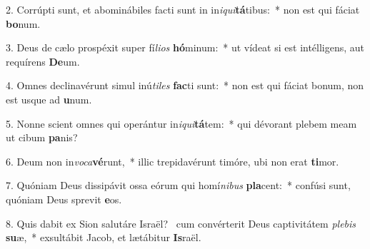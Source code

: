 2. Corrúpti sunt, et abominábiles facti sunt in in\textit{i}\textit{qui}\textbf{tá}tibus:~*  non est qui fáciat \textbf{bo}num.\

3. Deus de cælo prospéxit super fí\textit{li}\textit{os} \textbf{hó}minum:~*  ut vídeat si est intélligens, aut requírens \textbf{De}um.\

4. Omnes declinavérunt simul inú\textit{ti}\textit{les} \textbf{fac}ti sunt:~*  non est qui fáciat bonum, non est usque ad \textbf{u}num.\

5. Nonne scient omnes qui operántur in\textit{i}\textit{qui}\textbf{tá}tem:~*  qui dévorant plebem meam ut cibum \textbf{pa}nis?\

6. Deum non in\textit{vo}\textit{ca}\textbf{vé}runt,~*  illic trepidavérunt timóre, ubi non erat \textbf{ti}mor.\

7. Quóniam Deus dissipávit ossa eórum qui homí\textit{ni}\textit{bus} \textbf{pla}cent:~*  confúsi sunt, quóniam Deus sprevit \textbf{e}os.\

8. Quis dabit ex Sion salutáre Israël? \dag\  cum convérterit Deus captivitátem \textit{ple}\textit{bis} \textbf{su}æ,~*  exsultábit Jacob, et lætábitur \textbf{Is}raël.\

